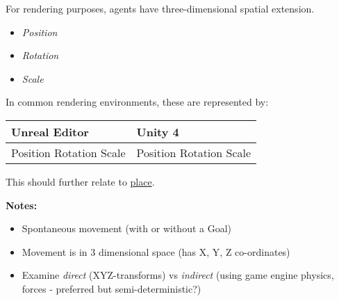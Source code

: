 \documentclass[]{article}
\begin{document}

For rendering purposes, agents have three-dimensional spatial extension.

\begin{itemize}
\itemsep1pt\parskip0pt
\item
  \emph{Position}
\item
  \emph{Rotation}
\item
  \emph{Scale}
\end{itemize}

In common rendering environments, these are represented by:

\begin{longtable}[c]{@{}ll@{}}
\toprule
\begin{minipage}[b]{0.29\columnwidth}\raggedright\strut
Unreal Editor
\strut\end{minipage} &
\begin{minipage}[b]{0.22\columnwidth}\raggedright\strut
Unity 4
\strut\end{minipage}\tabularnewline
\midrule
\endhead
\begin{minipage}[t]{0.29\columnwidth}\raggedright\strut
Position Rotation Scale
\strut\end{minipage} &
\begin{minipage}[t]{0.22\columnwidth}\raggedright\strut
Position Rotation Scale
\strut\end{minipage}\tabularnewline
\bottomrule
\end{longtable}

This should further relate to \hyperref[place]{place}.


\textbf{Notes:}

\begin{itemize}
\itemsep1pt\parskip0pt
\item
  Spontaneous movement (with or without a Goal)
\item
  Movement is in 3 dimensional space (has X, Y, Z co-ordinates)
\item
  Examine \emph{direct} (XYZ-transforms) vs \emph{indirect} (using game
  engine physics, forces - preferred but semi-deterministic?)
\end{itemize}
\end{document}
